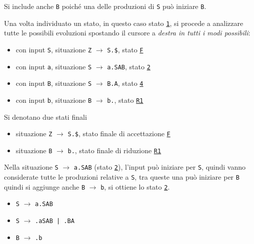 Si include anche \texttt{B} poiché una delle produzioni di \texttt{S} può iniziare \texttt{B}.

Una volta individuato un stato, in questo caso stato \texttt{\underline{1}}, si procede a analizzare tutte le possibili evoluzioni spostando il cursore a \textit{destra in tutti i modi possibili}:

\begin{itemize}
    \item con input \texttt{S}, situazione \texttt{Z} $\rightarrow$ \texttt{S.\$}, stato \texttt{\underline{F}}
    \item con input \texttt{a}, situazione \texttt{S} $\rightarrow$ \texttt{a.SAB}, stato \texttt{\underline{2}}
    \item con input \texttt{B}, situazione \texttt{S} $\rightarrow$ \texttt{B.A}, stato \texttt{\underline{4}}
    \item con input \texttt{b}, situazione \texttt{B} $\rightarrow$ \texttt{b.}, stato \texttt{\underline{R1}}
\end{itemize}
Si denotano due stati finali
\begin{itemize}
    \item situazione \texttt{Z} $\rightarrow$ \texttt{S.\$}, stato finale di accettazione \texttt{\underline{F}}
    \item situazione \texttt{B} $\rightarrow$ \texttt{b.}, stato finale di riduzione \texttt{\underline{R1}}
\end{itemize}

Nella situazione \texttt{S} $\rightarrow$ \texttt{a.SAB} (stato \texttt{\underline{2}}), l'input può iniziare per \texttt{S}, quindi vanno considerate tutte le produzioni relative a \texttt{S}, tra queste una può iniziare per \texttt{B} quindi si aggiunge anche \texttt{B} $\rightarrow$ \texttt{b}, si ottiene lo stato \texttt{\underline{2}}.
\begin{itemize}
    \item \texttt{S} $\rightarrow$ \texttt{a.SAB}
    \item \texttt{S} $\rightarrow$ \texttt{.aSAB | .BA}
    \item \texttt{B} $\rightarrow$ \texttt{.b}
\end{itemize}
\setlist{}


